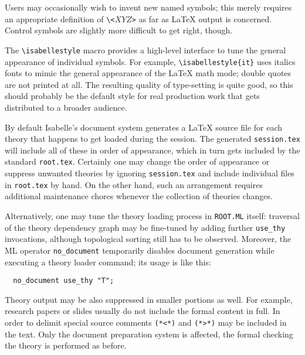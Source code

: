 \begin{isabellebody}
\begin{isamarkuptext}
  Users may occasionally wish to invent new named symbols; this merely
  requires an appropriate definition of \verb,\,\verb,<,$XYZ$\verb,>,
  as far as {\LaTeX} output is concerned.  Control symbols are
  slightly more difficult to get right, though.

  \medskip The \verb,\isabellestyle, macro provides a high-level
  interface to tune the general appearance of individual symbols.  For
  example, \verb,\isabellestyle{it}, uses italics fonts to mimic the
  general appearance of the {\LaTeX} math mode; double quotes are not
  printed at all.  The resulting quality of type-setting is quite
  good, so this should probably be the default style for real
  production work that gets distributed to a broader audience.%
\end{isamarkuptext}%
\isamarkuptrue%
%
\isamarkuptrue%
%
\begin{isamarkuptext}%
By default Isabelle's document system generates a {\LaTeX} source
  file for each theory that happens to get loaded during the session.
  The generated \texttt{session.tex} will include all of these in
  order of appearance, which in turn gets included by the standard
  \texttt{root.tex}.  Certainly one may change the order of appearance
  or suppress unwanted theories by ignoring \texttt{session.tex} and
  include individual files in \texttt{root.tex} by hand.  On the other
  hand, such an arrangement requires additional maintenance chores
  whenever the collection of theories changes.

  Alternatively, one may tune the theory loading process in
  \texttt{ROOT.ML} itself: traversal of the theory dependency graph
  may be fine-tuned by adding further \verb,use_thy, invocations,
  although topological sorting still has to be observed.  Moreover,
  the ML operator \verb,no_document, temporarily disables document
  generation while executing a theory loader command; its usage is
  like this:

\begin{verbatim}
  no_document use_thy "T";
\end{verbatim}

  \medskip Theory output may be also suppressed in smaller portions as
  well.  For example, research papers or slides usually do not include
  the formal content in full.  In order to delimit  special source comments
  \verb,(,\verb,*,\verb,<,\verb,*,\verb,), and
  \verb,(,\verb,*,\verb,>,\verb,*,\verb,), may be included in the
  text.  Only the document preparation system is affected, the formal
  checking the theory is performed as before.


\end{isamarkuptext}
\end{isabellebody}

